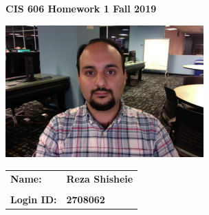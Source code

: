 \documentclass[11pt]{article}
\begin{document}
\thispagestyle{plain}

\begin{center}
{\Large \bf CIS 606 \hfil Homework 1 \hfil Fall 2019} \\
\end{center}

\vskip 1in 

\centerline{\includegraphics[width=3in]{photo.jpg}}

\vskip 0.5in 

\begin{center}
\begin{tabular}{ll}
{\bf Name:}     & {\bf Reza Shisheie } \\ \\
{\bf Login ID:} & {\bf 2708062 }   
\end{tabular}
\end{center}

\newpage
\end{document}
